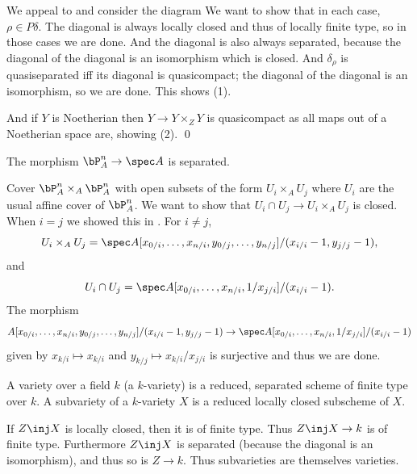 \eprop

\bproof

    We appeal to  and consider the diagram
    We want to show that in each case, $\rho\in P\delta$.
    The diagonal is always locally closed and thus of locally finite type, so in those cases we are done.
    And the diagonal is also always separated, because the diagonal of the diagonal is an isomorphism
    which is closed.
    And $\delta_\rho$ is quasiseparated iff its diagonal is quasicompact; the diagonal of the diagonal is an
    isomorphism, so we are done.
    This shows (1).

    And if $Y$ is Noetherian then $Y\to Y\times_ZY$ is quasicompact as all maps out of a Noetherian space
    are, showing (2).
    \qed

\eproof

\bexam

    The morphism $\bP^n_A\to\spec A$ is separated.

    Cover $\bP^n_A\times_A\bP^n_A$ with open subsets of the form $U_i\times_AU_j$ where $U_i$ are the usual
    affine cover of $\bP^n_A$.
    We want to show that $U_i\cap U_j\to U_i\times_AU_j$ is closed.
    When $i=j$ we showed this in .
    For $i\neq j$,
    $$ U_i\times_AU_j = \spec A[x_{0/i},\dots,x_{n/i},y_{0/j},\dots,y_{n/j}]/(x_{i/i}-1,y_{j/j}-1) , $$
    and
    $$ U_i\cap U_j = \spec A[x_{0/i},\dots,x_{n/i},1/x_{j/i}]/(x_{i/i}-1) . $$
    The morphism
    $$ A[x_{0/i},\dots,x_{n/i},y_{0/j},\dots,y_{n/j}]/(x_{i/i}-1,y_{j/j}-1) \to
    \spec A[x_{0/i},\dots,x_{n/i},1/x_{j/i}]/(x_{i/i}-1) $$
    given by $x_{k/i}\mapsto x_{k/i}$ and $y_{k/j}\mapsto x_{k/i}/x_{j/i}$ is surjective and thus we are done.

\eexam

\bdefn

    A {\emphcolor variety} over a field $k$ (a {\emphcolor $k$-variety}) is a reduced, separated scheme
    of finite type over $k$.
    A {\emphcolor subvariety} of a $k$-variety $X$ is a reduced locally closed subscheme of $X$.

\edefn

If $Z\inj X$ is locally closed, then it is of finite type.
Thus $Z\inj X\to k$ is of finite type.
Furthermore $Z\inj X$ is separated (because the diagonal is an isomorphism), and thus so is $Z\to k$.
Thus subvarieties are themselves varieties.

